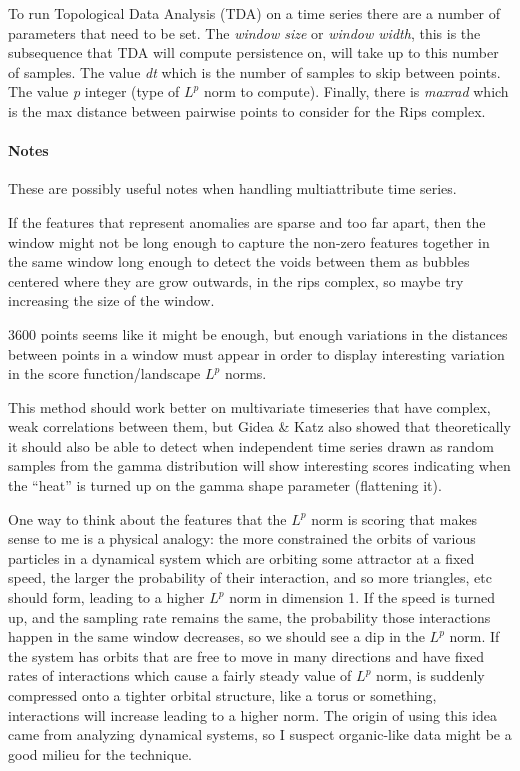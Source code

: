 \documentclass[titlepage, letterpaper, 12pt]{article}
\begin{document}
To run Topological Data Analysis (TDA) on a time series there are a number of parameters that need to be set.  The \textit{window size} or \textit{window width}, this is the subsequence that TDA will compute persistence on, will take up to this number of samples.  The value \textit{dt} which is the number of samples to skip between points.  The value \textit{p} integer (type of \(L^p\) norm to compute).  Finally, there is \textit{maxrad} which is the max distance between pairwise points to consider for the Rips complex.

\paragraph{Notes}
These are possibly useful notes when handling multiattribute time series.

If the features that represent anomalies are sparse and too far apart, then the window might not be long enough to capture the non-zero features together in the same window long enough to detect the voids between them as bubbles centered where they are grow outwards, in the rips complex, so maybe try increasing the size of the window.

3600 points seems like it might be enough, but enough variations in the distances between points in a window must appear in order to display interesting variation in the score function/landscape \(L^p\) norms.

This method should work better on multivariate timeseries that have complex, weak correlations between them, but Gidea \& Katz also showed that theoretically it should also be able to detect when independent time series drawn as random samples from the gamma distribution will show interesting scores indicating when the ``heat'' is turned up on the gamma shape parameter (flattening it).

One way to think about the features that the \(L^p\) norm is scoring that makes sense to me is a physical analogy: the more constrained the orbits of various particles in a dynamical system which are orbiting some 
attractor at a fixed speed, the larger the probability of their interaction, and so more triangles, etc should form, leading to a higher \(L^p\) norm in dimension 1.  If the speed is turned up, and the sampling 
rate remains the same, the probability those interactions happen in the same window decreases, so we should see a dip in the \(L^p\) norm.  If the system has orbits that are free to move in many directions and have 
fixed rates of interactions which cause a fairly steady value of \(L^p\) norm, is suddenly compressed onto a tighter orbital structure, like a torus or something, interactions will increase leading to a higher 
norm.  The origin of using this idea came from analyzing dynamical systems, so I suspect organic-like data might be a good milieu for the technique.
\end{document}
